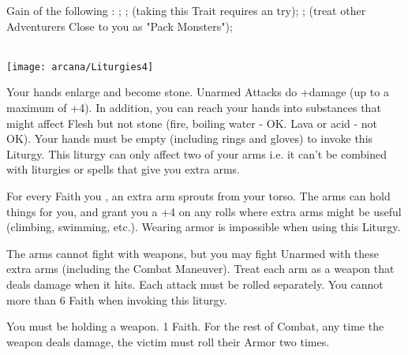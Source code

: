 \begin{multicols*}{2}
Gain \DICE of the following : ; ;
 (taking this Trait requires an \INSANITY try); ;
 (treat other Adventurers Close to you as "Pack Monsters");  
\\~ 


\begin{center}
\texttt{[image: arcana/Liturgies4]}
\end{center}


\LITURGY [
  Name = Mountainhands,
  Link = arcana-mystery-mountainhands,
  Paradigm = Empyrean,
  Duration=2 Maneuver Actions
]

Your hands enlarge and become stone.  Unarmed Attacks do +\DICE damage (up to a maximum of +4).  In addition, you can reach your hands into substances that might affect Flesh but not stone (fire, boiling water - OK.  Lava or acid - not OK). Your hands must be empty (including rings and gloves) to invoke this Liturgy. This liturgy can only affect two of your arms i.e. it can't be combined with liturgies or spells that give you extra arms.


\LITURGY [
    Name = Pummeling Hands,
    Link = arcana-mystery-pummeling-hands,
    Paradigm = Monstrous,
    Duration=\DICE Maneuvers
]

For every Faith you , an extra arm sprouts from your torso. The arms can hold things for you, and grant you a +4 on any rolls where extra arms might be useful (climbing, swimming, etc.). Wearing armor is impossible when using this Liturgy.

The arms cannot fight with weapons, but you may fight Unarmed with these extra arms (including the  Combat Maneuver). Treat each arm as a \FOC weapon that deals \DICE damage when it hits. Each attack must be rolled separately.  You cannot  more than 6 Faith when invoking this liturgy.


\LITURGY [
  Name = Rending Strike,
  Link = arcana-mystery-rending-strike,
  Paradigm = Ruinous,
  Duration=1 Maneuver Action
]

You must be holding a  weapon.  1 Faith. For the rest of Combat, any time the weapon deals damage, the victim must roll their Armor \UD two times.


\end{multicols*}
